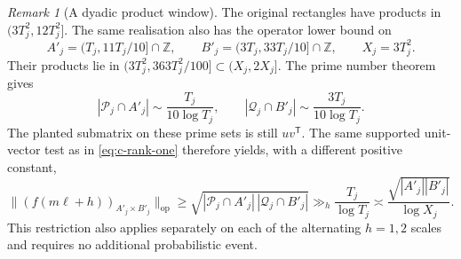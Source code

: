 \documentclass[11pt]{article}
\theoremstyle{definition}
\newcommand{\Z}{\mathbb Z}
\theoremstyle{remark}
\newtheorem{remark}[theorem]{Remark}
\numberwithin{equation}{section}
\newcommand{\op}{\mathrm{op}}
\begin{document}
\begin{remark}[A dyadic product window]\label{rem:c-dyadic}
The original rectangles have products in $(3T_j^2,12T_j^2]$.
The same realisation also has the operator lower bound on
\begin{equation}\label{eq:c-dyadic-rectangle}
 A'_j=(T_j,11T_j/10]\cap\Z,\qquad B'_j=(3T_j,33T_j/10]\cap\Z,
 \qquad X_j=3T_j^2.
\end{equation}
Their products lie in $(3T_j^2,363T_j^2/100]\subset(X_j,2X_j]$.
The prime number theorem gives
\begin{equation}\label{eq:c-dyadic-primes}
 |\mathcal P_j\cap A'_j|\sim\frac{T_j}{10\log T_j},\qquad
 |\mathcal Q_j\cap B'_j|\sim\frac{3T_j}{10\log T_j}.
\end{equation}
The planted submatrix on these prime sets is still $uv^{\mathsf T}$. The same supported unit-vector
test as in \eqref{eq:c-rank-one} therefore yields, with a different positive constant,
\begin{equation}\label{eq:c-dyadic-norm}
 \|(f(m\ell+h))_{A'_j\times B'_j}\|_\op
 \ge\sqrt{|\mathcal P_j\cap A'_j|\,|\mathcal Q_j\cap B'_j|}
 \gg_h\frac{T_j}{\log T_j}
 \asymp\frac{\sqrt{|A'_j||B'_j|}}{\log X_j}.
\end{equation}
This restriction also applies separately on each of the alternating $h=1,2$ scales and requires no
additional probabilistic event.
\end{remark}
\end{document}
